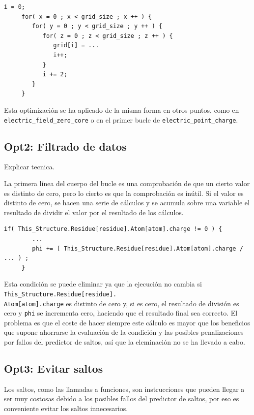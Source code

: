 \begin{lstlisting}[]
     i = 0;
     for( x = 0 ; x < grid_size ; x ++ ) {
        for( y = 0 ; y < grid_size ; y ++ ) {
           for( z = 0 ; z < grid_size ; z ++ ) {
              grid[i] = ...
              i++;
           }
           i += 2;
        }
     }
\end{lstlisting}

Esta optimizaci\'{o}n se ha aplicado de la misma forma en otros puntos, como en
\texttt{electric\_field\_zero\_core} o en el primer bucle de
\texttt{electric\_point\_charge}.

\subsection{Opt2: Filtrado de datos}

Explicar tecnica.

La primera l\'{i}nea del cuerpo del bucle es una comprobaci\'{o}n de que un
cierto valor es distinto de cero, pero lo cierto es que la comprobaci\'{o}n es
in\'{u}til. Si el valor es distinto de cero, se hacen una serie de c\'{a}lculos
y se acumula sobre una variable el resultado de dividir el valor por el
resultado de los c\'{a}lculos.

\begin{lstlisting}[]
     if( This_Structure.Residue[residue].Atom[atom].charge != 0 ) {
        ...
        phi += ( This_Structure.Residue[residue].Atom[atom].charge / ... ) ;
     }
\end{lstlisting}

Esta condici\'{o}n se puede eliminar ya que la ejecuci\'{o}n no cambia si
\texttt{This\_Structure.Residue[residue].\\Atom[atom].charge} es distinto de
cero y, si es cero, el resultado de divisi\'{o}n es cero y
\texttt{phi} se incrementa cero, haciendo que el resultado final sea correcto.
El problema es que el coste de hacer siempre este c\'{a}lculo es mayor que los
beneficios que supone ahorrarse la evaluaci\'{o}n de la condici\'{o}n y las
posibles penalizaciones
por fallos del predictor de saltos, as\'{i} que la eleminaci\'{o}n no se ha
llevado a cabo.

\subsection{Opt3: Evitar saltos}

Los saltos, como las llamadas a funciones, son instrucciones que pueden llegar
a ser muy costosas debido a  los posibles fallos del predictor de saltos, por
eso es conveniente evitar los saltos innecesarios.

